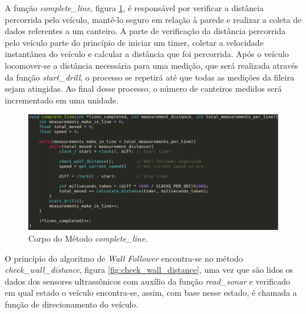  A função \textit{complete\_line}, figura \ref{fig:complete_line}, é responsável por verificar a distância percorrida pelo veículo, mantê-lo
  seguro em relação à parede e realizar a coleta de dados referentes a um canteiro. A parte de verificação
  da distância percorrida pelo veículo parte do princípio
  de iniciar um timer, coletar a velocidade instantânea do veículo e calcular a distância que foi percorrida.
  Após o veículo locomover-se a distância necessária para uma medição, que
  será realizada através da função \textit{start\_drill}, o processo se repetirá até que todas as medições da fileira sejam atingidas. Ao final desse processo, o número de canteiros medidos será incrementado em uma unidade.

  \begin{figure}[!htbp]
  \begin{center}
  \includegraphics[width=1\textwidth]{figuras/complete_line.eps}
  \caption{\label{fig:complete_line}Corpo do Método \textit{complete\_line}.}
  \end{center}
  \end{figure}

  O princípio do algoritmo de \textit{Wall Follower} encontra-se no método \textit{check\_wall\_distance}, figura \ref{fig:check_wall_distance}, uma vez que são lidos os dados dos sensores ultrassônicos com auxílio
  da função \textit{read\_sonar} e verificado em qual estado o veículo encontra-se, assim, com base nesse estado, é chamada a função de direcionamento do veículo.

